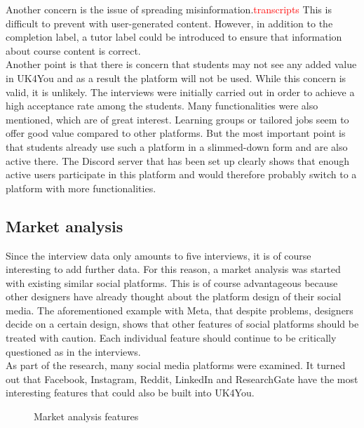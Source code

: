 Another concern is the issue of spreading misinformation.\textcolor{red}{transcripts}
This is difficult to prevent with user-generated content.
However, in addition to the completion label, a tutor label could be introduced to ensure that information about course content is correct.\\

Another point is that there is concern that students may not see any added value in UK4You and as a result the platform will not be used.
While this concern is valid, it is unlikely.
The interviews were initially carried out in order to achieve a high acceptance rate among the students.
Many functionalities were also mentioned, which are of great interest.
Learning groups or tailored jobs seem to offer good value compared to other platforms.
But the most important point is that students already use such a platform in a slimmed-down form and are also active there.
The Discord server that has been set up clearly shows that enough active users participate in this platform and would therefore probably switch to a platform with more functionalities.

\subsection{Market analysis}
Since the interview data only amounts to five interviews, it is of course interesting to add further data.
For this reason, a market analysis was started with existing similar social platforms.
This is of course advantageous because other designers have already thought about the platform design of their social media.
The aforementioned example with Meta, that despite problems, designers decide on a certain design, shows that other features of social platforms should be treated with caution.
Each individual feature should continue to be critically questioned as in the interviews.\\

As part of the research, many social media platforms were examined.
It turned out that Facebook, Instagram, Reddit, LinkedIn and ResearchGate have the most interesting features that could also be built into UK4You.

\begin{figure}[ht]
    \centering
    \caption{Market analysis features}
    \label{fig:market-analysis}
\end{figure}

